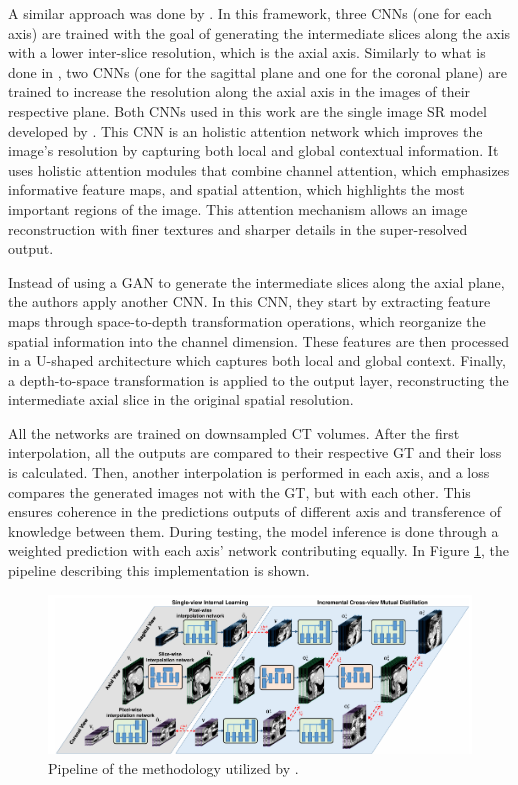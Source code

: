 A similar approach was done by \textcite{Fang2022}. In this framework, three CNNs (one for each axis) are trained with the goal of generating the intermediate slices along the axis with a lower inter-slice resolution, which is the axial axis. Similarly to what is done in \textcite{Zhang2024}, two CNNs (one for the sagittal plane and one for the coronal plane) are trained to increase the resolution along the axial axis in the images of their respective plane. Both CNNs used in this work are the single image SR model developed by \textcite{Niu2020}. This CNN is an holistic attention network which improves the image's resolution by capturing both local and global contextual information. It uses holistic attention modules that combine channel attention, which emphasizes informative feature maps, and spatial attention, which highlights the most important regions of the image. This attention mechanism allows an image reconstruction with finer textures and sharper details in the super-resolved output.
\par
Instead of using a GAN to generate the intermediate slices along the axial plane, the authors apply another CNN. In this CNN, they start by extracting feature maps through space-to-depth transformation operations, which reorganize the spatial information into the channel dimension. These features are then processed in a U-shaped architecture which captures both local and global context. Finally, a depth-to-space transformation is applied to the output layer, reconstructing the intermediate axial slice in the original spatial resolution.
\par
All the networks are trained on downsampled CT volumes. After the first interpolation, all the outputs are compared to their respective GT and their loss is calculated. Then, another interpolation is performed in each axis, and a loss compares the generated images not with the GT, but with each other. This ensures coherence in the predictions outputs of different axis and transference of knowledge between them. During testing, the model inference is done through a weighted prediction with each axis' network contributing equally. In Figure \ref{fig:FangArchitecture}, the pipeline describing this implementation is shown.

\begin{figure}[!ht]
	\hspace*{-1.0in}
	\includegraphics[width=1.25\linewidth]{figures/FangArchitecture.png}
	\caption{Pipeline of the methodology utilized by \textcite{Fang2022}.}
	\label{fig:FangArchitecture}
\end{figure}

